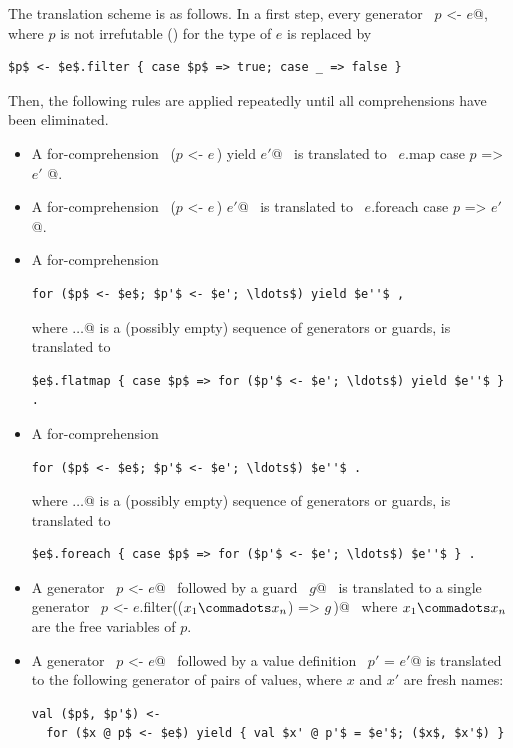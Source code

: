 The translation scheme is as follows.  In a first step, every
generator ~\lstinline@$p$ <- $e$@, where $p$ is not irrefutable ()
for the type of $e$ is replaced by
\begin{lstlisting}
$p$ <- $e$.filter { case $p$ => true; case _ => false }
\end{lstlisting}

Then, the following rules are applied repeatedly until all
comprehensions have been eliminated.
\begin{itemize}
\item
A for-comprehension 
~\lstinline@for ($p$ <- $e\,$) yield $e'$@~ 
is translated to
~\lstinline@$e$.map { case $p$ => $e'$ }@.

\item
A for-comprehension
~\lstinline@for ($p$ <- $e\,$) $e'$@~ 
is translated to
~\lstinline@$e$.foreach { case $p$ => $e'$ }@.

\item
A for-comprehension
\begin{lstlisting}
for ($p$ <- $e$; $p'$ <- $e'; \ldots$) yield $e''$ ,
\end{lstlisting}
where \lstinline@$\ldots$@ is a (possibly empty)
sequence of generators or guards,
is translated to
\begin{lstlisting}
$e$.flatmap { case $p$ => for ($p'$ <- $e'; \ldots$) yield $e''$ } .
\end{lstlisting}
\item
A for-comprehension
\begin{lstlisting}
for ($p$ <- $e$; $p'$ <- $e'; \ldots$) $e''$ .
\end{lstlisting}
where \lstinline@$\ldots$@ is a (possibly empty)
sequence of generators or guards,
is translated to
\begin{lstlisting}
$e$.foreach { case $p$ => for ($p'$ <- $e'; \ldots$) $e''$ } .
\end{lstlisting}
\item
A generator ~\lstinline@$p$ <- $e$@~ followed by a guard
~\lstinline@if $g$@~ is translated to a single generator 
~\lstinline@$p$ <- $e$.filter(($x_1 \commadots x_n$) => $g\,$)@~ where
$x_1 \commadots x_n$ are the free variables of $p$.
\item
A generator ~\lstinline@$p$ <- $e$@~ followed by a value definition 
~\lstinline@val $p'$ = $e'$@ is translated to the following generator of pairs of values, where
$x$ and $x'$ are fresh names:
\begin{lstlisting}
val ($p$, $p'$) <- 
  for ($x @ p$ <- $e$) yield { val $x' @ p'$ = $e'$; ($x$, $x'$) }
\end{lstlisting}
\end{itemize}


